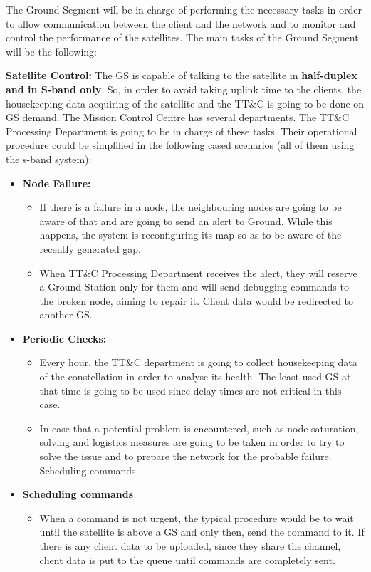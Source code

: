The Ground Segment will be in charge of performing the necessary tasks in order to allow communication between the client and the network and to monitor and control the performance of the satellites. The main tasks of the Ground Segment will be the following:

\textbf{Satellite Control:} The GS is capable of talking to the satellite in \textbf{half-duplex and in S-band only}. So, in order to avoid taking uplink time to the clients, the housekeeping data acquiring of the satellite and the TT\&C is going to be done on GS demand. The Mission Control Centre has several departments. The TT\&C Processing Department is going to be in charge of these tasks. Their operational procedure could be simplified in the following cased scenarios (all of them using the s-band system):

\begin{itemize}

\item \textbf{Node Failure:}
\begin{itemize}
\item If there is a failure in a node, the neighbouring nodes are going to be aware of that and are going to send an alert to Ground. While this happens, the system is reconfiguring its map so as to be aware of the recently generated gap.
\item When TT\&C Processing Department receives the alert, they will reserve a Ground Station only for them and will send debugging commands to the broken node, aiming to repair it. Client data would be redirected to another GS.
\end{itemize}

\item \textbf{Periodic Checks:}

\begin{itemize}
\item Every hour, the TT\&C department is going to collect housekeeping data of the constellation in order to analyse its health. The least used GS at that time is going to be used since delay times are not critical in this case.
\item In case that a potential problem is encountered, such as node saturation, solving and logistics measures are going to be taken in order to try to solve the issue and to prepare the network for the probable failure.
Scheduling commands
\end{itemize}

\item \textbf{Scheduling commands}

\begin{itemize}
\item When a command is not urgent, the typical procedure would be to wait until the satellite is above a GS and only then, send the command to it. If there is any client data to be uploaded, since they share the channel, client data is put to the queue until commands are completely sent.
\end{itemize}

\end{itemize}

